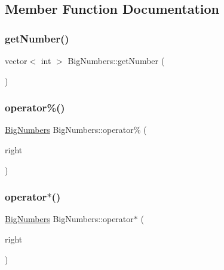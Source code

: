\subsection{Member Function Documentation}
\mbox{\label{class_big_numbers_ab140c7d7b759d5c27c21103d781c58d6}} 
\subsubsection{\texorpdfstring{get\+Number()}{getNumber()}}
{\footnotesize\ttfamily vector$<$ int $>$ Big\+Numbers\+::get\+Number (\begin{DoxyParamCaption}{ }\end{DoxyParamCaption})}

\mbox{\label{class_big_numbers_a0f8b955476c8d9ee64627e20ca771859}} 
\subsubsection{\texorpdfstring{operator\%()}{operator\%()}}
{\footnotesize\ttfamily \mbox{\hyperlink{class_big_numbers}{Big\+Numbers}} Big\+Numbers\+::operator\% (\begin{DoxyParamCaption}\item[{const \mbox{\hyperlink{class_big_numbers}{Big\+Numbers}} \&}]{right }\end{DoxyParamCaption})}

\mbox{\label{class_big_numbers_ab4a10f12b8f3712f4a5d71f5290bc0f9}} 
\subsubsection{\texorpdfstring{operator$\ast$()}{operator*()}}
{\footnotesize\ttfamily \mbox{\hyperlink{class_big_numbers}{Big\+Numbers}} Big\+Numbers\+::operator$\ast$ (\begin{DoxyParamCaption}\item[{const \mbox{\hyperlink{class_big_numbers}{Big\+Numbers}} \&}]{right }\end{DoxyParamCaption})}

